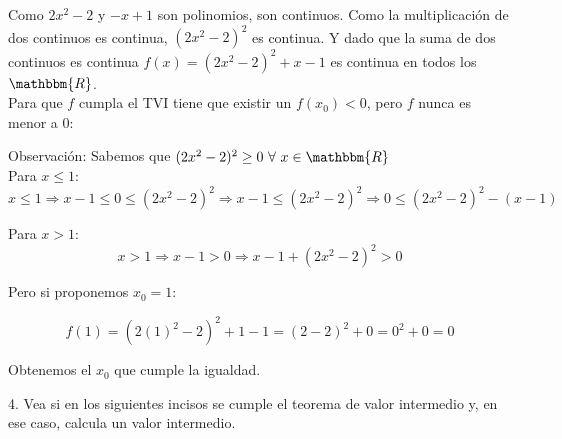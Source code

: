 \documentclass[12pt]{article}
\begin{document}
\begin{enumerate}[\hspace{9px} a)]
    Como $2x^2-2$ y $-x+1$ son polinomios, son continuos. Como la multiplicación de dos continuos es continua, $(2x^2-2)^2$ es continua. Y dado que la suma de dos continuos es continua $f(x)=(2x^2-2)^2+x-1$ es continua en todos los $\mathbbm{R}$.\\

    Para que $f$ cumpla el TVI tiene que existir un $f(x_0)<0$, pero $f$ nunca es menor a 0:

    Observación: Sabemos que $(2x^2-2)^2 \geq 0 \ \forall \ x \in \mathbbm{R}$\\

    Para $x \leq 1$:
    \[x \leq 1 \Rightarrow x-1 \leq 0 \leq (2x^2-2)^2 \Rightarrow x-1 \leq (2x^2-2)^2 \Rightarrow 0 \leq (2x^2-2)^2-(x-1)\]

    Para $x>1$:
    \[x>1 \Rightarrow x-1>0 \Rightarrow x-1+(2x^2-2)^2>0\]

    Pero si proponemos $x_0=1$:

    \[f(1)=(2(1)^2-2)^2+1-1=(2-2)^2+0=0^2+0=0\]

    Obtenemos el $x_0$ que cumple la igualdad.\\

\end{enumerate}

4. Vea si en los siguientes incisos se cumple el teorema de valor intermedio y, en ese caso, calcula un valor intermedio.
\end{document}
